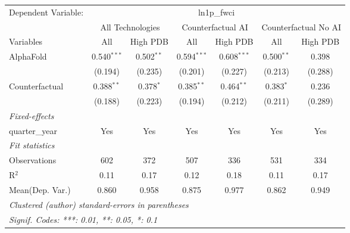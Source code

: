 \begingroup
\centering
\begin{tabular}{lcccccc}
   \tabularnewline \midrule \midrule
   Dependent Variable: & \multicolumn{6}{c}{ln1p\_fwci}\\
 & \multicolumn{2}{c}{All Technologies} & \multicolumn{2}{c}{Counterfactual AI} & \multicolumn{2}{c}{Counterfactual No AI} \\
\cmidrule(lr){1-1}\cmidrule(lr){2-3} \cmidrule(lr){4-5} \cmidrule(lr){6-7}
Variables & \multicolumn{1}{c}{All} & \multicolumn{1}{c}{High PDB} & \multicolumn{1}{c}{All} & \multicolumn{1}{c}{High PDB} & \multicolumn{1}{c}{All} & \multicolumn{1}{c}{High PDB} \\
\cmidrule(lr){1-1}\cmidrule(lr){2-2} \cmidrule(lr){3-3} \cmidrule(lr){4-4} \cmidrule(lr){5-5} \cmidrule(lr){6-6} \cmidrule(lr){7-7}
   AlphaFold      & 0.540$^{***}$ & 0.502$^{**}$ & 0.594$^{***}$ & 0.608$^{***}$ & 0.500$^{**}$ & 0.398\\   
                  & (0.194)       & (0.235)      & (0.201)       & (0.227)       & (0.213)      & (0.288)\\   
   Counterfactual & 0.388$^{**}$  & 0.378$^{*}$  & 0.385$^{**}$  & 0.464$^{**}$  & 0.383$^{*}$  & 0.236\\   
                  & (0.188)       & (0.223)      & (0.194)       & (0.212)       & (0.211)      & (0.289)\\   
   \midrule
   \emph{Fixed-effects}\\
   quarter\_year  & Yes           & Yes          & Yes           & Yes           & Yes          & Yes\\  
   \midrule
   \emph{Fit statistics}\\
   Observations   & 602           & 372          & 507           & 336           & 531          & 334\\  
   R$^2$          & 0.11          & 0.17         & 0.12          & 0.18          & 0.11         & 0.17\\  
Mean(Dep. Var.) & 0.860 & 0.958 & 0.875 & 0.977 & 0.862 & 0.949 \\
   \midrule \midrule
   \multicolumn{7}{l}{\emph{Clustered (author) standard-errors in parentheses}}\\
   \multicolumn{7}{l}{\emph{Signif. Codes: ***: 0.01, **: 0.05, *: 0.1}}\\
\end{tabular}
\par\endgroup
